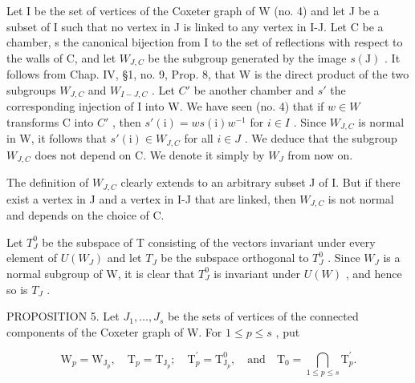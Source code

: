Let I be the set of vertices of the Coxeter graph of W (no. 4) and let J be a subset of I such that no vertex in J is linked to any vertex in I-J. Let C be a chamber, s the canonical bijection from I to the set of reflections with respect to the walls of C, and let \(W_{J,C}\) be the subgroup generated by the image \(s(\mathrm{J})\) . It follows from Chap. IV, §1, no. 9, Prop. 8, that W is the direct product of the two subgroups \(W_{J,C}\) and \(W_{I-J,C}\) . Let \(C'\) be another chamber and \(s'\) the corresponding injection of I into W. We have seen (no. 4) that if \(w \in W\) transforms C into \(C'\) , then \(s'(\mathrm{i}) = ws(\mathrm{i})w^{-1}\) for \(i \in I\) . Since \(W_{J,C}\) is normal in W, it follows that \(s'(\mathrm{i}) \in W_{J,C}\) for all \(i \in J\) . We deduce that the subgroup \(W_{J,C}\) does not depend on C. We denote it simply by \(W_{J}\) from now on.

The definition of \(W_{J,C}\) clearly extends to an arbitrary subset J of I. But if there exist a vertex in J and a vertex in I-J that are linked, then \(W_{J,C}\) is not normal and depends on the choice of C.

Let \(T_{J}^{0}\) be the subspace of T consisting of the vectors invariant under every element of \(U(W_{J})\) and let \(T_{J}\) be the subspace orthogonal to \(T_{J}^{0}\) . Since \(W_{J}\) is a normal subgroup of W, it is clear that \(T_{J}^{0}\) is invariant under \(U(W)\) , and hence so is \(T_{J}\) .

PROPOSITION 5. Let \(J_{1},\ldots,J_{s}\) be the sets of vertices of the connected components of the Coxeter graph of W. For \(1\leqslant p\leqslant s\) , put

\[
\mathrm{W} _ {p} = \mathrm{W} _ {\mathrm{J} _ {p}}, \quad \mathrm{T} _ {p} = \mathrm{T} _ {\mathrm{J} _ {p}}; \quad \mathrm{T} _ {p} ^ {\prime} = \mathrm{T} _ {\mathrm{J} _ {p}} ^ {0}, \quad \text {and} \quad \mathrm{T} _ {0} = \bigcap_ {1 \leqslant p \leqslant s} \mathrm{T} _ {p} ^ {\prime}.
\]

